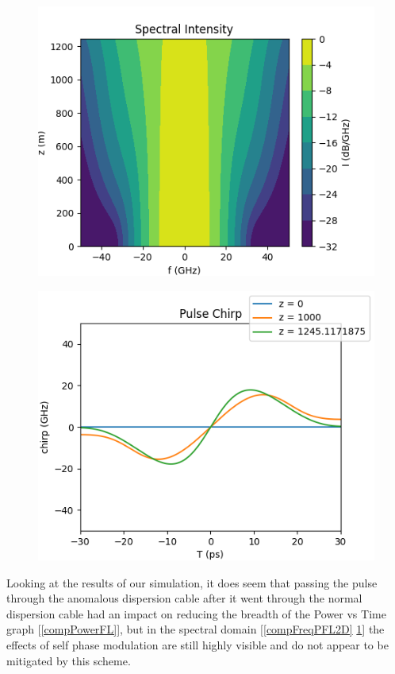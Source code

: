 \documentclass[10pt, a4paper, twocolumn]{article} %
\begin{document}
\begin{figure}
    \includegraphics[width=\linewidth]{plots/compFreqDbFL2D.png}
    \caption{}
    \label{compFreqDbFL2D}
\end{figure}

\begin{figure}
    \includegraphics[width=\linewidth]{plots/compChirpFL.png}
    \caption{}
    \label{compChirpFL}
\end{figure}

Looking at the results of our simulation, it does seem that passing the pulse through the anomalous dispersion cable after it went through the normal dispersion cable had an impact on reducing the breadth of the Power vs Time graph [\ref{compPowerFL}], but in the spectral domain [\ref{compFreqPFL2D} \ref{compFreqDbFL2D}] the effects of self phase modulation are still highly visible and do not appear to be mitigated by this scheme.
\end{document}
